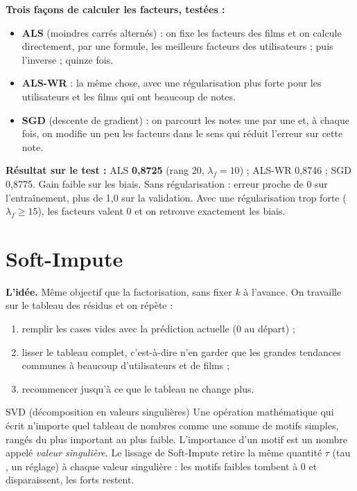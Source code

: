 \documentclass[11pt,a4paper]{article}
\newcommand{\resultat}[1]{\par\textbf{Résultat sur le test :} #1\par}
\begin{document}
\textbf{Trois façons de calculer les facteurs, testées :}
\begin{itemize}
  \item \textbf{ALS} (moindres carrés alternés) : on fixe les facteurs des films et on
        calcule directement, par une formule, les meilleurs facteurs des utilisateurs ;
        puis l'inverse ; quinze fois.
  \item \textbf{ALS-WR} : la même chose, avec une régularisation plus forte pour les
        utilisateurs et les films qui ont beaucoup de notes.
  \item \textbf{SGD} (descente de gradient) : on parcourt les notes une par une et, à chaque
        fois, on modifie un peu les facteurs dans le sens qui réduit l'erreur sur cette note.
\end{itemize}

\resultat{ALS \textbf{0,8725} (rang 20, $\lambda_f = 10$) ; ALS-WR 0,8746 ; SGD 0,8775.
Gain faible sur les biais. Sans régularisation : erreur proche de 0 sur l'entraînement,
plus de 1,0 sur la validation. Avec une régularisation trop forte ($\lambda_f \geq 15$),
les facteurs valent 0 et on retrouve exactement les biais.}

\section{Soft-Impute}

\textbf{L'idée.} Même objectif que la factorisation, sans fixer $k$ à l'avance. On
travaille sur le tableau des résidus et on répète :
\begin{enumerate}
  \item remplir les cases vides avec la prédiction actuelle (0 au départ) ;
  \item \og lisser \fg{} le tableau complet, c'est-à-dire n'en garder que les grandes
        tendances communes à beaucoup d'utilisateurs et de films ;
  \item recommencer jusqu'à ce que le tableau ne change plus.
\end{enumerate}

\begin{definition}{SVD (décomposition en valeurs singulières)}
Une opération mathématique qui écrit n'importe quel tableau de nombres comme une somme de
\og motifs \fg{} simples, rangés du plus important au plus faible. L'importance d'un motif
est un nombre appelé \emph{valeur singulière}. Le lissage de Soft-Impute retire la même
quantité $\tau$ (\og tau \fg, un réglage) à chaque valeur singulière : les motifs faibles
tombent à 0 et disparaissent, les forts restent.
\end{definition}
\end{document}
